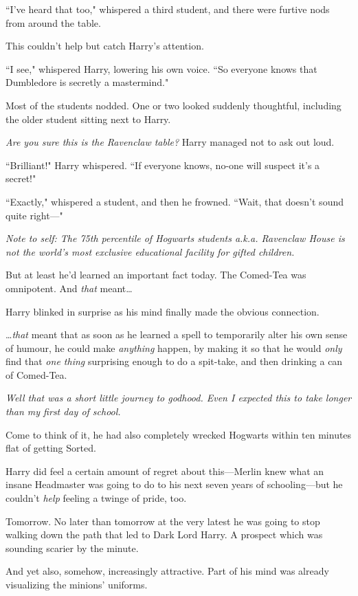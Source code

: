 ``I've heard that too," whispered a third student, and there were furtive nods from around the table.

This couldn't help but catch Harry's attention.

``I see," whispered Harry, lowering his own voice. ``So everyone knows that Dumbledore is secretly a mastermind."

Most of the students nodded. One or two looked suddenly thoughtful, including the older student sitting next to Harry.

\emph{Are you sure this is the Ravenclaw table?} Harry managed not to ask out loud.

``Brilliant!" Harry whispered. ``If everyone knows, no-one will suspect it's a secret!"

``Exactly," whispered a student, and then he frowned. ``Wait, that doesn't sound quite right—"

\emph{Note to self: The 75th percentile of Hogwarts students a.k.a. Ravenclaw House is not the world's most exclusive educational facility for gifted children.}

But at least he'd learned an important fact today. The Comed-Tea was omnipotent. And \emph{that} meant{\ldots}

Harry blinked in surprise as his mind finally made the obvious connection.

{\ldots}\emph{that} meant that as soon as he learned a spell to temporarily alter his own sense of humour, he could make \emph{anything} happen, by making it so that he would \emph{only} find that \emph{one thing} surprising enough to do a spit-take, and then drinking a can of Comed-Tea.

\emph{Well that was a short little journey to godhood. Even I expected this to take longer than my first day of school.}

Come to think of it, he had also completely wrecked Hogwarts within ten minutes flat of getting Sorted.

Harry did feel a certain amount of regret about this—Merlin knew what an insane Headmaster was going to do to his next seven years of schooling—but he couldn't \emph{help} feeling a twinge of pride, too.

Tomorrow. No later than tomorrow at the very latest he was going to stop walking down the path that led to Dark Lord Harry. A prospect which was sounding scarier by the minute.

And yet also, somehow, increasingly attractive. Part of his mind was already visualizing the minions' uniforms.

